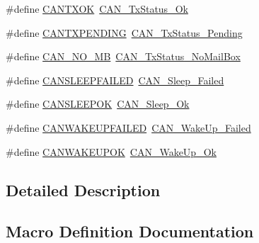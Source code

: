 \begin{DoxyCompactItemize}
\item 
\#define \hyperlink{group___c_a_n___legacy_ga288ba42cf1de7572f2fe1378268c9452}{C\+A\+N\+T\+X\+OK}~\hyperlink{group___c_a_n__transmit__constants_ga0b401c61922b1449de9b486dcf475c97}{C\+A\+N\+\_\+\+Tx\+Status\+\_\+\+Ok}
\item 
\#define \hyperlink{group___c_a_n___legacy_ga76f43f4c54505b1f87b39b056ca38897}{C\+A\+N\+T\+X\+P\+E\+N\+D\+I\+NG}~\hyperlink{group___c_a_n__transmit__constants_ga9678a3a51379422868083608c7394409}{C\+A\+N\+\_\+\+Tx\+Status\+\_\+\+Pending}
\item 
\#define \hyperlink{group___c_a_n___legacy_ga418f1fd7ca2e852b263fd07874fde0c6}{C\+A\+N\+\_\+\+N\+O\+\_\+\+MB}~\hyperlink{group___c_a_n__transmit__constants_ga2620e99debd51011d3569121f2e44690}{C\+A\+N\+\_\+\+Tx\+Status\+\_\+\+No\+Mail\+Box}
\item 
\#define \hyperlink{group___c_a_n___legacy_ga4d5e8e0c57febb024b30e5f24866a117}{C\+A\+N\+S\+L\+E\+E\+P\+F\+A\+I\+L\+ED}~\hyperlink{group___c_a_n__sleep__constants_ga169500ab7169c4e9c7e9e4ea34b3e070}{C\+A\+N\+\_\+\+Sleep\+\_\+\+Failed}
\item 
\#define \hyperlink{group___c_a_n___legacy_ga2f8d34f8f60a6c84d8e436d4d37708ab}{C\+A\+N\+S\+L\+E\+E\+P\+OK}~\hyperlink{group___c_a_n__sleep__constants_gaf5c4e9d32d4faff9d0bf61e153ed7998}{C\+A\+N\+\_\+\+Sleep\+\_\+\+Ok}
\item 
\#define \hyperlink{group___c_a_n___legacy_ga0de3b0e2c544d9fa772b646e331e51b1}{C\+A\+N\+W\+A\+K\+E\+U\+P\+F\+A\+I\+L\+ED}~\hyperlink{group___c_a_n__wake__up__constants_ga837fd7ad47fee78e43a186544e2b390b}{C\+A\+N\+\_\+\+Wake\+Up\+\_\+\+Failed}
\item 
\#define \hyperlink{group___c_a_n___legacy_gafed6ab4dbb00c9d63f6a7cdf323f33ef}{C\+A\+N\+W\+A\+K\+E\+U\+P\+OK}~\hyperlink{group___c_a_n__wake__up__constants_ga152e4935cf85bdfb803eb36b656cd690}{C\+A\+N\+\_\+\+Wake\+Up\+\_\+\+Ok}
\end{DoxyCompactItemize}


\subsection{Detailed Description}


\subsection{Macro Definition Documentation}
\mbox{\label{group___c_a_n___legacy_ga1b3d041dff9fed4dad75ed2a4a0e27e0}} 
